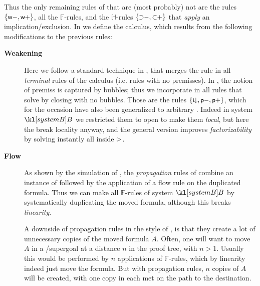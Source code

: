 Thus the only remaining rules of  that are (most probably) not
 are the  rules $\{\text{\small$\mathsf{w{-}}$},\text{\small$\mathsf{w{+}}$}\}$, all the
$\mathbb{F}$-rules, and the $\mathbb{H}$-rules $\{\text{\small$\mathsf{{\supset}{-}}$},
\text{\small$\mathsf{{\subset}{+}}$}\}$ that \emph{apply} an implication/exclusion.
In  we define the  calculus, which results
from the following modifications to the previous rules:
\begin{description}
  \item[\textbf{Weakening}]
    Here we follow a standard technique in , that merges the
     rule in all \emph{terminal} rules of the calculus (i.e. rules with
    no premisses). In , the notion of premiss is captured by
     bubbles; thus we incorporate  in all rules that solve
     by closing  with no  bubbles. Those are the rules
    $\{\text{\small$\mathsf{i{\downarrow}}$},\text{\small$\mathsf{p{-}}$},\text{\small$\mathsf{p{+}}$}\}$, which for the occasion have
    also been generalized to arbitrary . Indeed in system $\sysB$ we
    restricted them to open  to make them \emph{local}, but here the
     break locality anyway, and the general version improves
    \emph{factorizability} by solving instantly all  inside $\mathbin{\rhd}$.

  \item[\textbf{Flow}]
    As shown by the simulation of , the
    \emph{propagation} rules of  combine an instance of
    \emph{} followed by the application of a flow rule on the
    duplicated formula. Thus we can make all $\mathbb{F}$-rules of system
    $\sysB$  by systematically duplicating the moved formula, although
    this breaks \emph{linearity}.

    A downside of propagation rules in the style of , is that they
    create a lot of unnecessary copies of the moved formula $A$. Often, one will
    want to move $A$ in a /supergoal at a distance $n$ in the proof tree,
    with $n > 1$. Usually this would be performed by $n$ applications of
    $\mathbb{F}$-rules, which by linearity indeed just move the formula. But with
    propagation rules, $n$ copies of $A$ will be created, with one copy in each
     met on the path to the destination.


\end{description}
